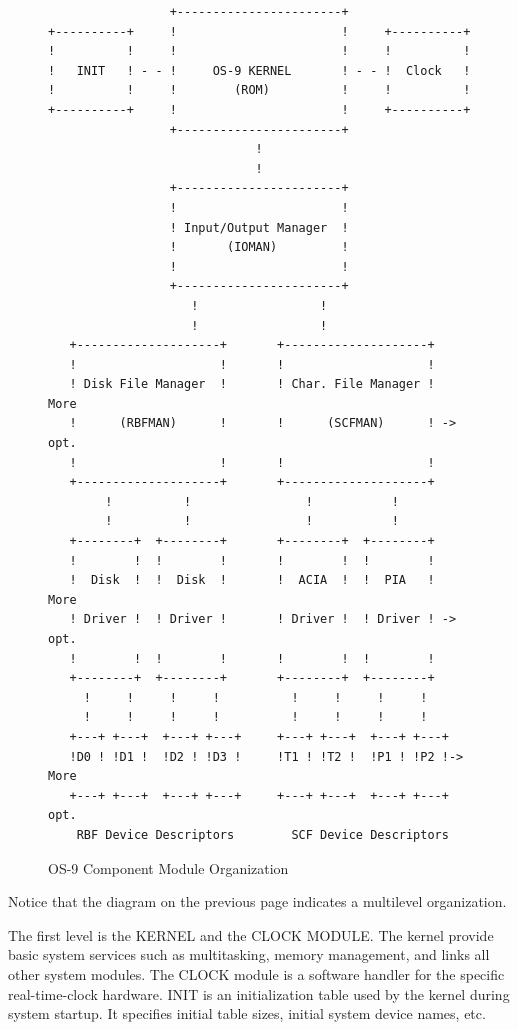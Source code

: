 \documentclass[
]{article}
\begin{document}
\begin{figure}
\centering
\begin{verbatim}
                 +-----------------------+
+----------+     !                       !     +----------+
!          !     !                       !     !          !
!   INIT   ! - - !     OS-9 KERNEL       ! - - !  Clock   !
!          !     !        (ROM)          !     !          !
+----------+     !                       !     +----------+
                 +-----------------------+
                             !
                             !
                 +-----------------------+
                 !                       !
                 ! Input/Output Manager  !
                 !       (IOMAN)         !
                 !                       !
                 +-----------------------+
                    !                 !
                    !                 !
   +--------------------+       +--------------------+
   !                    !       !                    !
   ! Disk File Manager  !       ! Char. File Manager !    More
   !      (RBFMAN)      !       !      (SCFMAN)      ! -> opt.
   !                    !       !                    !
   +--------------------+       +--------------------+
        !          !                !           !
        !          !                !           !
   +--------+  +--------+       +--------+  +--------+
   !        !  !        !       !        !  !        !
   !  Disk  !  !  Disk  !       !  ACIA  !  !  PIA   !    More
   ! Driver !  ! Driver !       ! Driver !  ! Driver ! -> opt.
   !        !  !        !       !        !  !        !
   +--------+  +--------+       +--------+  +--------+
     !     !     !     !          !     !     !     !
     !     !     !     !          !     !     !     !
   +---+ +---+  +---+ +---+     +---+ +---+  +---+ +---+
   !D0 ! !D1 !  !D2 ! !D3 !     !T1 ! !T2 !  !P1 ! !P2 !-> More
   +---+ +---+  +---+ +---+     +---+ +---+  +---+ +---+   opt.
    RBF Device Descriptors        SCF Device Descriptors
\end{verbatim}
\caption{OS-9 Component Module Organization}
\end{figure}

Notice that the diagram on the previous page indicates a multilevel
organization.

The first level is the KERNEL and the CLOCK MODULE. The kernel provide
basic system services such as multitasking, memory management, and links
all other system modules. The CLOCK module is a software handler for the
specific real-time-clock hardware. INIT is an initialization table used
by the kernel during system startup. It specifies initial table sizes,
initial system device names, etc.
\end{document}
